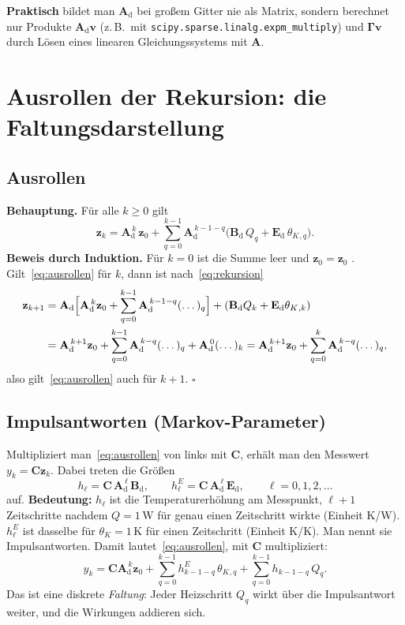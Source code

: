 \documentclass[11pt,a4paper]{article}
\numberwithin{equation}{section}
\newcommand{\thK}{\theta_{K}}
\newcommand{\mA}{\mathbf{A}}
\newcommand{\mC}{\mathbf{C}}
\newcommand{\mAd}{\mathbf{A}_{\mathrm d}}
\newcommand{\mBd}{\mathbf{B}_{\mathrm d}}
\newcommand{\mEd}{\mathbf{E}_{\mathrm d}}
\newcommand{\vz}{\mathbf{z}}
\newcommand{\vv}{\mathbf{v}}
\begin{document}
\textbf{Praktisch} bildet man $\mAd$ bei großem Gitter nie als Matrix, sondern berechnet nur Produkte $\mAd\vv$ (z.\,B.\ mit \texttt{scipy.sparse.linalg.expm\_multiply}) und $\symbf{\Gamma}\vv$ durch Lösen eines linearen Gleichungssystems mit $\mA$.

\section{Ausrollen der Rekursion: die Faltungsdarstellung}
\label{sec:faltung}

\subsection{Ausrollen}

\textbf{Behauptung.} Für alle $k\ge0$ gilt
\begin{equation}
 \vz_k=\mAd^{\,k}\,\vz_0+\sum_{q=0}^{k-1}\mAd^{\,k-1-q}\bigl(\mBd\,Q_q+\mEd\,\thK{}_{,q}\bigr).
 \label{eq:ausrollen}
\end{equation}
\textbf{Beweis durch Induktion.} Für $k=0$ ist die Summe leer und $\vz_0=\vz_0$ \checkmark. Gilt~\eqref{eq:ausrollen} für $k$, dann ist nach~\eqref{eq:rekursion}
\begin{align*}
 \vz_{k+1}&=\mAd\Bigl[\mAd^{\,k}\vz_0+\sum_{q=0}^{k-1}\mAd^{\,k-1-q}(\dots)_q\Bigr]+(\mBd Q_k+\mEd\thK{}_{,k})\\
 &=\mAd^{\,k+1}\vz_0+\sum_{q=0}^{k-1}\mAd^{\,k-q}(\dots)_q+\mAd^{\,0}(\dots)_k
 =\mAd^{\,k+1}\vz_0+\sum_{q=0}^{k}\mAd^{\,k-q}(\dots)_q,
\end{align*}
also gilt~\eqref{eq:ausrollen} auch für $k+1$. $\square$

\subsection{Impulsantworten (Markov-Parameter)}

Multipliziert man~\eqref{eq:ausrollen} von links mit $\mC$, erhält man den Messwert $y_k=\mC\vz_k$. Dabei treten die Größen
\begin{equation}
 h_\ell=\mC\,\mAd^{\,\ell}\,\mBd,\qquad h^E_\ell=\mC\,\mAd^{\,\ell}\,\mEd,\qquad \ell=0,1,2,\dots
 \label{eq:markov}
\end{equation}
auf. \textbf{Bedeutung:} $h_\ell$ ist die Temperaturerhöhung am Messpunkt, $\ell+1$ Zeitschritte nachdem $Q=1$\,W für genau einen Zeitschritt wirkte (Einheit K/W). $h^E_\ell$ ist dasselbe für $\thK=1$\,K für einen Zeitschritt (Einheit K/K). Man nennt sie Impulsantworten. Damit lautet~\eqref{eq:ausrollen}, mit $\mC$ multipliziert:
\begin{equation}
 y_k=\mC\mAd^{\,k}\vz_0+\sum_{q=0}^{k-1}h^E_{k-1-q}\,\thK{}_{,q}+\sum_{q=0}^{k-1}h_{k-1-q}\,Q_q .
 \label{eq:faltung}
\end{equation}
Das ist eine diskrete \emph{Faltung}: Jeder Heizschritt $Q_q$ wirkt über die Impulsantwort weiter, und die Wirkungen addieren sich.
\end{document}
